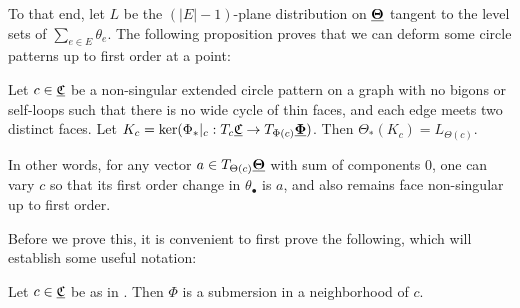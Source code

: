 To that end, let $L$ be the $(|E|-1)$-plane distribution on ${\underline{\mathbf{\Theta}}}$
tangent to the level sets of $\sum_{e\in E} \theta_e$.
The following proposition proves that we can deform
some circle patterns up to first order at a point:


\begin{prop}
\label{p:point_lift}
Let $c \in {\underline{\mathfrak{C}}}$ be a
non-singular extended circle pattern on a graph
with no bigons or self-loops such that
there is no wide cycle of thin faces,
and each edge meets two distinct faces.
Let $K_c = \ker (\Phi_*|_c : T_c {\underline{\mathfrak{C}}} \to T_{\Phi(c)} {\underline{\mathbf{\Phi}}})$.
Then $\Theta_*(K_c) = L_{\Theta(c)}$.

In other words, for any vector $a \in T_{\Theta(c)} {\underline{\mathbf{\Theta}}}$
with sum of components 0, one can vary $c$ so that its
first order change in $\theta_\bullet$ is $a$,
and also remains face non-singular up to first order.
\end{prop}


Before we prove this, it is convenient to first prove the following,
which will establish some useful notation:

\begin{lemma}
\label{l:Phi_full}
Let $c \in {\underline{\mathfrak{C}}}$ be as in .
Then $\Phi$ is a submersion in a neighborhood of $c$.
\end{lemma}

